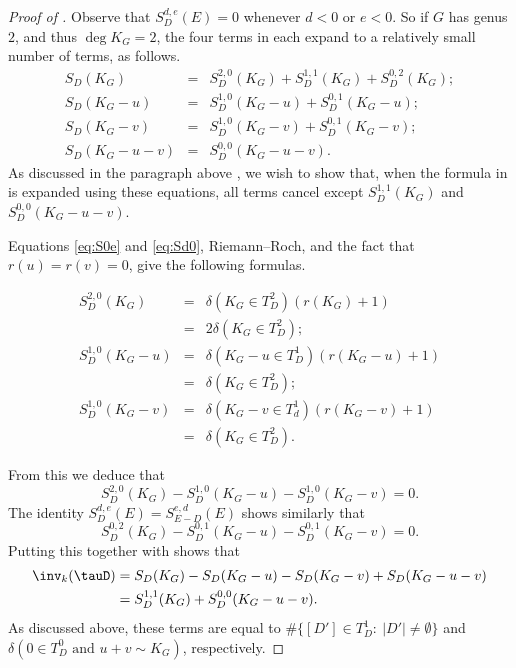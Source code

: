 \begin{proof}[Proof of ] \label{proof:invtau}
Observe that $S^{d,e}_D(E) = 0$ whenever $d<0$ or $e<0$. So if $G$ has genus $2$, and thus $\deg K_G = 2$, the four terms in  each expand to a relatively small number of terms, as follows.
\begin{eqnarray*}
S_D(K_G) &=& S^{2,0}_D(K_G) + S^{1,1}_D(K_G) + S^{0,2}_D(K_G);\\
S_D(K_G-u) &=& S^{1,0}_D(K_G-u) + S^{0,1}_D(K_G-u);\\
S_D(K_G-v) &=& S^{1,0}_D(K_G-v) + S^{0,1}_D(K_G-v);\\
S_D(K_G-u-v) &=& S^{0,0}_D(K_G-u-v).
\end{eqnarray*}
As discussed in the paragraph above , we wish to show that, when the formula in  is expanded using these equations, all terms cancel except $S^{1,1}_D(K_G)$ and $S^{0,0}_D(K_G-u-v)$.

Equations \eqref{eq:S0e} and \eqref{eq:Sd0}, Riemann--Roch, and the fact that $r(u) = r(v) = 0$, give the following formulas.

\begin{eqnarray*}
S^{2,0}_D(K_G) &=& \delta( K_G \in T^2_D) \left( r(K_G) + 1 \right)\\
&=& 2 \delta( K_G \in T^2_D);\\
S^{1,0}_D(K_G-u) &=& \delta(K_G - u \in T^1_D) \left( r(K_G-u) + 1 \right)\\
&=& \delta(K_G \in T^2_D);\\
S^{1,0}_D(K_G-v) &=& \delta( K_G -v \in T^1_d) \left( r(K_G-v) + 1 \right) \\
&=& \delta( K_G \in T^2_D).
\end{eqnarray*}

From this we deduce that
$$S^{2,0}_D(K_G) - S^{1,0}_D(K_G-u) - S^{1,0}_D(K_G-v) = 0.$$
The identity $S^{d,e}_D(E) = S^{e,d}_{E-D}(E)$ shows similarly that
$$S^{0,2}_D(K_G) - S^{0,1}_D(K_G-u) - S^{0,1}_D(K_G-v) = 0.$$
Putting this together with  shows that
\begin{align*}
\inv_k(\tauD) &= S_D(K_G) - S_D(K_G-u) - S_D(K_G-v) + S_D(K_G-u-v) \\&= S^{1,1}_D(K_G) + S^{0,0}_D(K_G-u-v).
\end{align*}
As discussed above, these terms are equal to $\# \{ [D'] \in T^1_D:\ |D'| \neq \emptyset \}$ and $\delta( 0 \in T^0_D \mbox{ and } u+v \sim K_G)$, respectively.
\end{proof}



